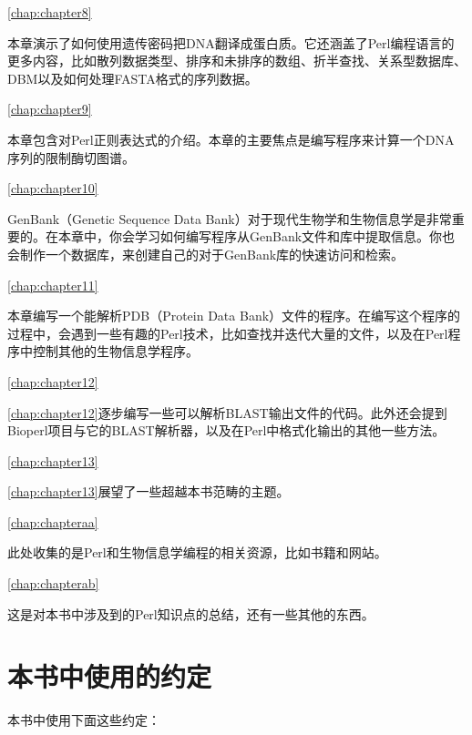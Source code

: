 \autoref{chap:chapter8}
\begin{adjustwidth}{1cm}{0cm}
本章演示了如何使用遗传密码把DNA翻译成蛋白质。它还涵盖了Perl编程语言的更多内容，比如散列数据类型、排序和未排序的数组、折半查找、关系型数据库、DBM以及如何处理FASTA格式的序列数据。
\end{adjustwidth}

\autoref{chap:chapter9}
\begin{adjustwidth}{1cm}{0cm}
本章包含对Perl正则表达式的介绍。本章的主要焦点是编写程序来计算一个DNA序列的限制酶切图谱。
\end{adjustwidth}

\autoref{chap:chapter10}
\begin{adjustwidth}{1cm}{0cm}
GenBank（Genetic Sequence Data Bank）对于现代生物学和生物信息学是非常重要的。在本章中，你会学习如何编写程序从GenBank文件和库中提取信息。你也会制作一个数据库，来创建自己的对于GenBank库的快速访问和检索。
\end{adjustwidth}

\autoref{chap:chapter11}
\begin{adjustwidth}{1cm}{0cm}
本章编写一个能解析PDB（Protein Data Bank）文件的程序。在编写这个程序的过程中，会遇到一些有趣的Perl技术，比如查找并迭代大量的文件，以及在Perl程序中控制其他的生物信息学程序。
\end{adjustwidth}

\autoref{chap:chapter12}
\begin{adjustwidth}{1cm}{0cm}
\autoref{chap:chapter12}逐步编写一些可以解析BLAST输出文件的代码。此外还会提到Bioperl项目与它的BLAST解析器，以及在Perl中格式化输出的其他一些方法。
\end{adjustwidth}

\autoref{chap:chapter13}
\begin{adjustwidth}{1cm}{0cm}
\autoref{chap:chapter13}展望了一些超越本书范畴的主题。
\end{adjustwidth}

\autoref{chap:chapteraa}
\begin{adjustwidth}{1cm}{0cm}
此处收集的是Perl和生物信息学编程的相关资源，比如书籍和网站。
\end{adjustwidth}

\autoref{chap:chapterab}
\begin{adjustwidth}{1cm}{0cm}
这是对本书中涉及到的Perl知识点的总结，还有一些其他的东西。
\end{adjustwidth}

\section*{本书中使用的约定}
本书中使用下面这些约定：

